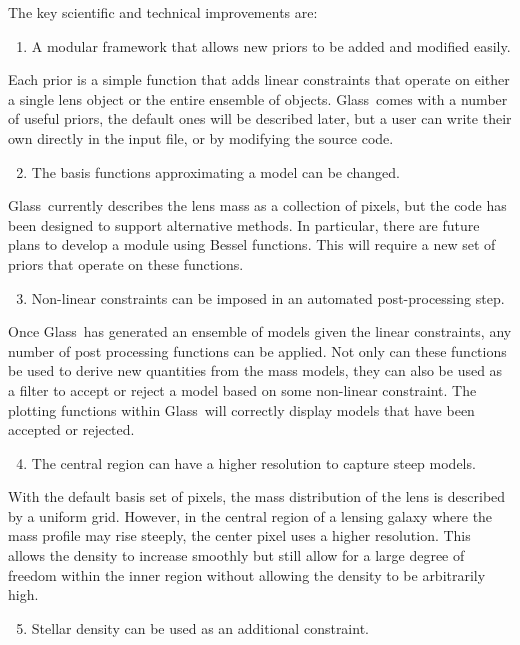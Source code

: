 \documentclass[galley,usenatbib]{mn2e}
\newcommand{\Glass}{{\sc Glass}}
\begin{document}
The key scientific and technical improvements are:
%
\begin{enumerate}
  \setcounter{enumi}{0}
  \item A modular framework that allows new priors to be added and modified easily.
\end{enumerate}
%
Each prior is a simple function that adds linear constraints that operate on either
a single lens object or the entire ensemble of objects. \Glass\ comes with a number
of useful priors, the default ones will be described later, but a user can
write their own directly in the input file, or by modifying the source code.
%
\begin{enumerate}
  \setcounter{enumi}{1}
  \item The basis functions approximating a model can be changed. 
\end{enumerate}
%
\Glass\ currently describes the lens mass as a collection of pixels, but the code
has been designed to support alternative methods. In particular, there are future
plans to develop a module using Bessel functions. This will require a new set of 
priors that operate on these functions.
%
\begin{enumerate}
  \setcounter{enumi}{2}
  \item Non-linear constraints can be imposed in an automated post-processing step. 
\end{enumerate}
%
Once \Glass\ has generated an ensemble of models given the linear constraints, any number
of post processing functions can be applied. Not only can these functions be used to
derive new quantities from the mass models, they can also be used as a filter to 
accept or reject a model based on some non-linear constraint. The plotting functions
within \Glass\ will correctly display models that have been accepted or rejected.
%
\begin{enumerate}
  \setcounter{enumi}{3}
  \item The central region can have a higher resolution to capture steep models. 
\end{enumerate}
%
With the default basis set of pixels, the mass distribution of the lens is
described by a uniform grid. However, in the central region of a lensing galaxy
where the mass profile may rise steeply, the center pixel uses a higher
resolution. This allows the density to increase smoothly but still allow for
a large degree of freedom within the inner region without allowing the density
to be arbitrarily high. 
%
\begin{enumerate}
  \setcounter{enumi}{4}
  \item Stellar density can be used as an additional constraint.  
\end{enumerate}
\end{document}
